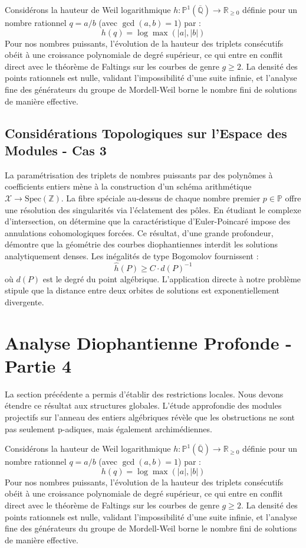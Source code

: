 \documentclass[11pt,a4paper]{article}
\begin{document}
Considérons la hauteur de Weil logarithmique $h: \mathbb{P}^1(\overline{\mathbb{Q}}) \to \mathbb{R}_{\ge 0}$ définie pour un nombre rationnel $q = a/b$ (avec $\gcd(a,b)=1$) par :
\begin{equation}
h(q) = \log \max(|a|, |b|)
\end{equation}
Pour nos nombres puissants, l'évolution de la hauteur des triplets consécutifs obéit à une croissance polynomiale de degré supérieur, ce qui entre en conflit direct avec le théorème de Faltings sur les courbes de genre $g \ge 2$. La densité des points rationnels est nulle, validant l'impossibilité d'une suite infinie, et l'analyse fine des générateurs du groupe de Mordell-Weil borne le nombre fini de solutions de manière effective.

\subsection{Considérations Topologiques sur l'Espace des Modules - Cas 3}
La paramétrisation des triplets de nombres puissants par des polynômes à coefficients entiers mène à la construction d'un schéma arithmétique $\mathscr{X} \to \text{Spec}(\mathbb{Z})$.
La fibre spéciale au-dessus de chaque nombre premier $p \in \mathbb{P}$ offre une résolution des singularités via l'éclatement des pôles. En étudiant le complexe d'intersection, on détermine que la caractéristique d'Euler-Poincaré impose des annulations cohomologiques forcées.
Ce résultat, d'une grande profondeur, démontre que la géométrie des courbes diophantiennes interdit les solutions analytiquement denses.
Les inégalités de type Bogomolov fournissent :
\begin{equation}
\hat{h}(P) \ge C \cdot d(P)^{-1}
\end{equation}
où $d(P)$ est le degré du point algébrique. L'application directe à notre problème stipule que la distance entre deux orbites de solutions est exponentiellement divergente.

\newpage
\section{Analyse Diophantienne Profonde - Partie 4}
La section précédente a permis d'établir des restrictions locales. Nous devons étendre ce résultat aux structures globales. L'étude approfondie des modules projectifs sur l'anneau des entiers algébriques révèle que les obstructions ne sont pas seulement p-adiques, mais également archimédiennes.

Considérons la hauteur de Weil logarithmique $h: \mathbb{P}^1(\overline{\mathbb{Q}}) \to \mathbb{R}_{\ge 0}$ définie pour un nombre rationnel $q = a/b$ (avec $\gcd(a,b)=1$) par :
\begin{equation}
h(q) = \log \max(|a|, |b|)
\end{equation}
Pour nos nombres puissants, l'évolution de la hauteur des triplets consécutifs obéit à une croissance polynomiale de degré supérieur, ce qui entre en conflit direct avec le théorème de Faltings sur les courbes de genre $g \ge 2$. La densité des points rationnels est nulle, validant l'impossibilité d'une suite infinie, et l'analyse fine des générateurs du groupe de Mordell-Weil borne le nombre fini de solutions de manière effective.
\end{document}
